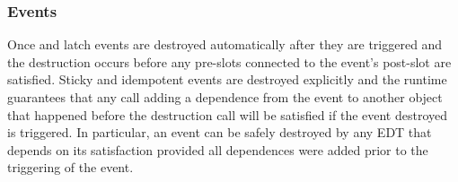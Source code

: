 \subsubsection{Events}
Once and latch events are destroyed automatically after they are triggered and
the destruction occurs before any pre-slots connected to the event's
post-slot are satisfied. Sticky and idempotent events are destroyed explicitly and
the runtime guarantees that any  call adding a dependence
from the event to another object that happened before the destruction call will
be satisfied if the event destroyed is triggered. In particular, an event
can be safely destroyed by any EDT that depends on its satisfaction provided
all dependences were added prior to the triggering of the event.
